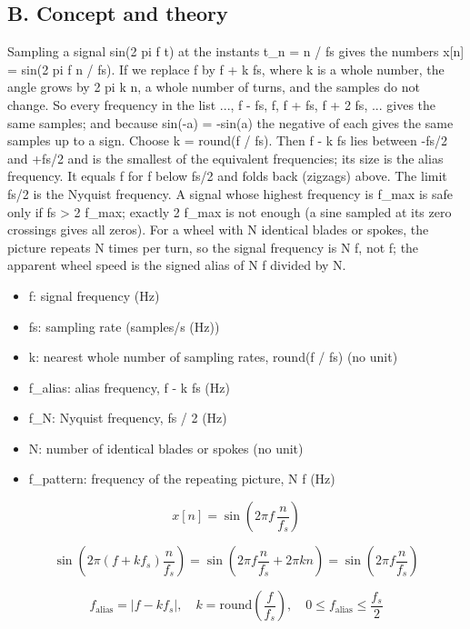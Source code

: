 \documentclass[11pt,a4paper]{article}
\begin{document}
\subsection*{B. Concept and theory}
Sampling a signal sin(2 pi f t) at the instants t\_n = n / fs gives the numbers x[n] = sin(2 pi f n / fs). If we replace f by f + k fs, where k is a whole number, the angle grows by 2 pi k n, a whole number of turns, and the samples do not change. So every frequency in the list ..., f - fs, f, f + fs, f + 2 fs, ... gives the same samples; and because sin(-a) = -sin(a) the negative of each gives the same samples up to a sign. Choose k = round(f / fs). Then f - k fs lies between -fs/2 and +fs/2 and is the smallest of the equivalent frequencies; its size is the alias frequency. It equals f for f below fs/2 and folds back (zigzags) above. The limit fs/2 is the Nyquist frequency. A signal whose highest frequency is f\_max is safe only if fs \textgreater{} 2 f\_max; exactly 2 f\_max is not enough (a sine sampled at its zero crossings gives all zeros). For a wheel with N identical blades or spokes, the picture repeats N times per turn, so the signal frequency is N f, not f; the apparent wheel speed is the signed alias of N f divided by N.

\begin{itemize}[nosep]
\item f: signal frequency (Hz)
\item fs: sampling rate (samples/s (Hz))
\item k: nearest whole number of sampling rates, round(f / fs) (no unit)
\item f\_alias: alias frequency, \textbar{}f - k fs\textbar{} (Hz)
\item f\_N: Nyquist frequency, fs / 2 (Hz)
\item N: number of identical blades or spokes (no unit)
\item f\_pattern: frequency of the repeating picture, N f (Hz)
\end{itemize}

\begin{equation*}
x[n]=\sin\!\left(2\pi f\,\frac{n}{f_s}\right)
\end{equation*}

\begin{equation*}
\sin\!\left(2\pi (f+k f_s)\frac{n}{f_s}\right)=\sin\!\left(2\pi f\frac{n}{f_s}+2\pi k n\right)=\sin\!\left(2\pi f\frac{n}{f_s}\right)
\end{equation*}

\begin{equation*}
f_{\text{alias}}=\left|f-k f_s\right|,\quad k=\mathrm{round}\!\left(\frac{f}{f_s}\right),\quad 0\le f_{\text{alias}}\le \frac{f_s}{2}
\end{equation*}
\end{document}
